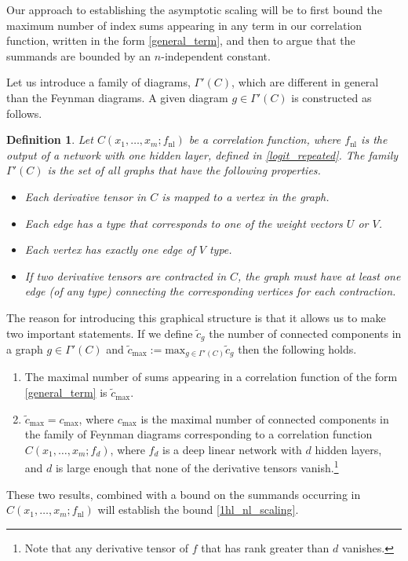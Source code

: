 \documentclass[english]{article}
\newtheorem{definition}{Definition}
\newcommand{\Gset}{\Gamma'(C)}
\newcommand{\fnl}{f_{\mathrm{nl}}}
\begin{document}
Our approach to establishing the asymptotic scaling will be to first bound the maximum number of index sums appearing in any term in our correlation function, written in the form \eqref{general_term}, and then to argue that the summands are bounded by an $n$-independent constant.

Let us introduce a family of diagrams, $\Gset$, which are different in general than the Feynman diagrams.
A given diagram $g\in \Gset$ is constructed as follows.
\begin{definition}\label{def:sumdiagram}
  Let $C(x_1,\dots,x_m;\fnl)$ be a correlation function, where $\fnl$ is the output of a network with one hidden layer, defined in \eqref{logit_repeated}.
  The family $\Gset$ is the set of all graphs that have the following properties.
  \begin{itemize}
  \item Each derivative tensor in $C$ is mapped to a vertex in the graph.
  \item Each edge has a type that corresponds to one of the weight vectors $U$ or $V$.
  \item Each vertex has exactly one edge of $V$ type.
  \item If two derivative tensors are contracted in $C$, the graph must have at least one edge (of any type) connecting the corresponding vertices for each contraction.
  \end{itemize}
\end{definition} 
The reason for introducing this graphical structure is that it allows us to make two important statements.
If we define $\tilde{c}_{g}$ the number of connected components in a graph $g \in \Gset$ and $\tilde{c}_{\textrm{max}} := \textrm{max}_{g\in \Gset}\tilde{c}_{g}$ then the following holds.
\begin{enumerate}
\item The maximal number of sums appearing in a correlation function of the form \eqref{general_term} is $\tilde{c}_{\textrm{max}}$.
\item $\tilde{c}_{\textrm{max}} = c_{\textrm{max}}$, where $c_{\textrm{max}}$ is the maximal number of connected components in the family of Feynman diagrams corresponding to a correlation function $C(x_1,\ldots, x_m;f_{d})$, where $f_{d}$ is a deep linear network with $d$ hidden layers, and $d$ is large enough that none of the derivative tensors vanish.\footnote{Note that any derivative tensor of $f$ that has rank greater than $d$ vanishes.}
\end{enumerate}
These two results, combined with a bound on the summands occurring in $C(x_1,\ldots,x_m;\fnl)$ will establish the bound \eqref{1hl_nl_scaling}.
\end{document}
